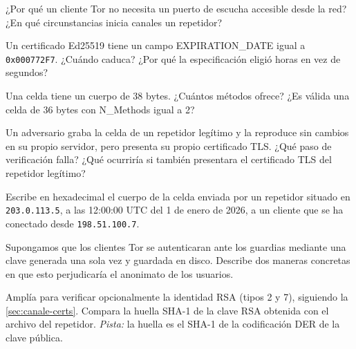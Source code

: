 \begin{esercizio}[1]\label{es:07-ruoli}
¿Por qué un cliente Tor no necesita un puerto de escucha accesible desde la red? ¿En qué circunstancias inicia canales un repetidor?
\end{esercizio}

\begin{esercizio}[1]\label{es:07-scadenza}
Un certificado Ed25519 tiene un campo EXPIRATION\_DATE igual a \texttt{0x000772F7}. ¿Cuándo caduca? ¿Por qué la especificación eligió horas en vez de segundos?
\end{esercizio}

\begin{esercizio}[1]\label{es:07-authchallenge}
Una celda  tiene un cuerpo de 38 bytes. ¿Cuántos métodos ofrece? ¿Es válida una celda de 36 bytes con N\_Methods igual a 2?
\end{esercizio}

\begin{esercizio}[2]\label{es:07-impostore}
Un adversario graba la celda  de un repetidor legítimo y la reproduce sin cambios en su propio servidor, pero presenta su propio certificado TLS. ¿Qué paso de verificación falla? ¿Qué ocurriría si también presentara el certificado TLS del repetidor legítimo?
\end{esercizio}

\begin{esercizio}[2]\label{es:07-netinfo}
Escribe en hexadecimal el cuerpo de la celda  enviada por un repetidor situado en \texttt{203.0.113.5}, a las 12:00:00 UTC del 1 de enero de 2026, a un cliente que se ha conectado desde \texttt{198.51.100.7}.
\end{esercizio}

\begin{esercizio}[2]\label{es:07-client-auth}
Supongamos que los clientes Tor se autenticaran ante los guardias mediante una clave generada una sola vez y guardada en disco. Describe dos maneras concretas en que esto perjudicaría el anonimato de los usuarios.
\end{esercizio}

\begin{esercizio}[2]\label{es:07-rsa}
Amplía  para verificar opcionalmente la identidad RSA (tipos 2 y 7), siguiendo la \cref{sec:canale-certs}. Compara la huella SHA-1 de la clave RSA obtenida con el archivo  del repetidor. \emph{Pista:} la huella es el SHA-1 de la codificación DER de la clave pública.
\end{esercizio}

